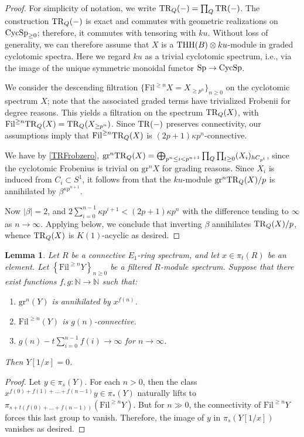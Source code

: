 \documentclass{amsart}
\newcommand{\fil}{\mathrm{Fil}}
\renewcommand{\sp}{\mathrm{Sp}}
\newcommand{\gr}{\mathrm{gr}}
\newtheorem{lemma}[theorem]{Lemma}
\theoremstyle{definition}
\begin{document}
\begin{proof} 
For simplicity of notation, we write $\mathrm{TR}_Q(-) = \prod_Q \mathrm{TR}(-)$. 
The construction $\mathrm{TR}_Q(-)$ is exact and commutes with geometric realizations on
$\mathrm{CycSp}_{\geq 0}$; therefore, it commutes with tensoring with $ku$. Without
loss of generality, we can therefore 
assume that $X$ is a $ \mathrm{THH}(B) \otimes ku$-module in graded cyclotomic spectra. Here we
regard $ku$ as a trivial cyclotomic spectrum, i.e., via the image of the unique
symmetric monoidal functor $\sp \to \cycsp$. 

We consider the descending filtration $\{ \fil^{\geq n } X = X_{\geq p^{n}}\}_{n \geq 0}$
on the cyclotomic spectrum $X$; note that the associated graded terms have
trivialized Frobenii for degree reasons. 
This yields a filtration on the spectrum $\mathrm{TR}_Q(X)$, with 
$\fil^{\geq n} \TR_Q(X) = \TR_Q(X_{\geq p^n})$. 
Since $\mathrm{TR}(-)$ preserves connectivity, our assumptions imply that 
$\fil^{\geq n} \TR_Q(X)$ is $(2p + 1) \kappa p^n$-connective. 

We have
by \eqref{TRFrobzero},
$\gr^n \TR_Q(X) =  \bigoplus_{p^{n} \leq i < p^{n+1}} \prod_Q\prod_{t \geq 0}
(X_i)_{hC_{p^t}}$, since the cyclotomic Frobenius is trivial on $\gr^n X$ for
grading reasons.
Since $X_i$ is induced from $C_i \subset S^1$, 
it follows from  that 
the $ku$-module
$\gr^n \TR_Q(X)/p $ is annihilated by 
$\beta^{ \kappa p^{n+1}}$. 


Now $|\beta| = 2$, and 
$2\sum_{i = 0}^{n-1} \kappa p^{i+1} < (2p+1)\kappa p^{n}$ with the difference tending to
$\infty$ as $n \to \infty$. 
Applying  below, we  conclude that 
inverting $\beta$ 
annihilates
$\mathrm{TR}_Q(X) /p$, whence $\mathrm{TR}_Q(X)$ is $K(1)$-acyclic as desired. 
\end{proof} 



\begin{lemma} 
Let $R$ be a connective $E_1$-ring spectrum, and let $x \in \pi_t(R)$ be an
element. 
Let $\left\{\fil^{\geq n} Y\right\}_{n \geq 0}$ be a 
filtered $R$-module spectrum. 
Suppose that there exist functions $f, g\colon  \mathbb{N} \to \mathbb{N}$ such that: 
\begin{enumerate}
\item $\gr^n (Y)$ is annihilated by $x^{f(n)}$. 
\item  $\fil^{\geq n}(Y)$ is $g(n)$-connective. 
\item  $g(n) - t\sum_{i = 0}^{n-1} f(i)  \to \infty $ for $n  \to \infty$. 
\end{enumerate}
Then $Y[1/x] = 0$. 
\label{invertingiszero}
\end{lemma} 
\begin{proof} 
Let $y \in \pi_s(Y)$. 
For each $n  > 0$, then the class
$x^{f(0) + f(1) + \dots + f(n-1)} y  \in \pi_*(Y)$ 
naturally lifts to $\pi_{s + t(f(0) + \dots  + f(n-1))}( \fil^{\geq n} Y)$. 
But for $n \gg 0$, 
the connectivity of $\fil^{\geq n} Y$
forces this last group to vanish. 
Therefore, the image of $y$ in $\pi_s(Y[1/x]) $ vanishes as desired. 
\end{proof} 
\end{document}
